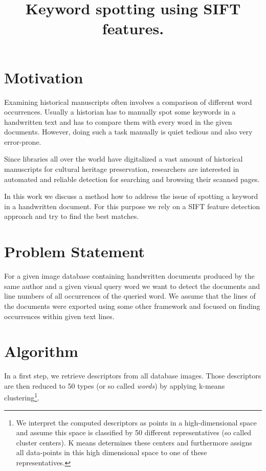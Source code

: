 \documentclass[conference]{IEEEtran}
\begin{document}
%
\title{Keyword spotting using SIFT features.}

\author{
\and
{}
}

\maketitle

\section{Motivation}
Examining historical manuscripts often involves a comparison of different word occurrences. Usually a historian has to manually spot some keywords in a handwritten text and has to compare them with every word in the given documents. However, doing such a task manually is quiet tedious and also very error-prone. 

Since libraries all over the world have digitalized a vast amount of historical manuscripts for cultural heritage preservation, researchers are interested in automated and reliable detection for searching and browsing their scanned pages.

In this work we discuss a method how to address the issue of spotting a keyword in a handwritten document. For this purpose we rely on a SIFT feature detection approach and try to find the best matches.

\section{Problem Statement}
For a given image database containing handwritten documents produced by the same author and a
given visual query word we want to detect the documents and line numbers of all
 occurrences of the queried word. We assume that the lines of the documents
were exported using some other framework and focused on finding occurrences within 
 given text lines.

\section{Algorithm}
In a first step, we retrieve descriptors from all database images. 
Those descriptors are then reduced to 50 types 
(or so called \emph{words}) by applying k-means clustering\footnote{We interpret the computed descriptors as points in a high-dimensional space and assume this space is classified by 50 different representatives (so called cluster centers). K means determines these centers and furthermore assigns all data-points in this high dimensional space to one of these representatives.}.
\end{document}
